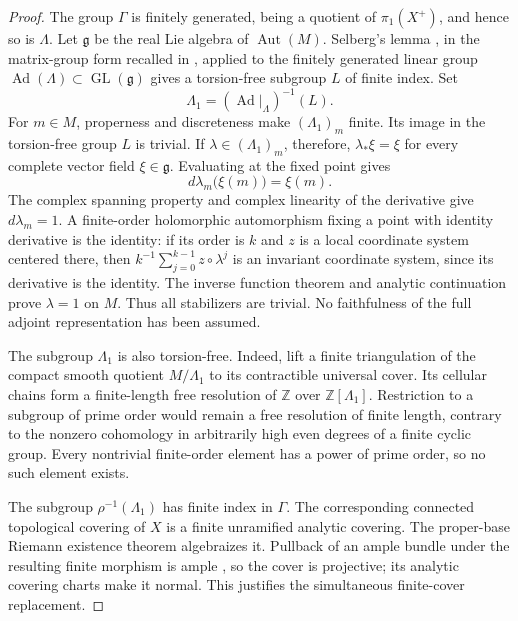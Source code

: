 \begin{proof}
The group $\Gamma$ is finitely generated, being a quotient of $\pi_1(X^+)$, and hence so is $\Lambda$. Let $\mathfrak{g}$ be the real Lie algebra of $\operatorname{Aut}(M)$. Selberg's lemma \cite[Lemma~8]{Selberg1960}, in the matrix-group form recalled in \cite[p.~435]{Wolf1968}, applied to the finitely generated linear group $\operatorname{Ad}(\Lambda)\subset\operatorname{GL}(\mathfrak{g})$ gives a torsion-free subgroup $L$ of finite index.  Set
\[
 \Lambda_1=(\operatorname{Ad}|_\Lambda)^{-1}(L).
\]
For $m\in M$, properness and discreteness make $(\Lambda_1)_m$ finite. Its image in the torsion-free group $L$ is trivial. If $\lambda\in(\Lambda_1)_m$, therefore, $\lambda_*\xi=\xi$ for every complete vector field $\xi\in\mathfrak{g}$.  Evaluating at the fixed point gives
\[
 d\lambda_m\bigl(\xi(m)\bigr)=\xi(m).
\]
The complex spanning property and complex linearity of the derivative give $d\lambda_m=1$.  A finite-order holomorphic automorphism fixing a point with identity derivative is the identity: if its order is $k$ and $z$ is a local coordinate system centered there, then $k^{-1}\sum_{j=0}^{k-1}z\circ\lambda^j$ is an invariant coordinate system, since its derivative is the identity.  The inverse function theorem and analytic continuation prove $\lambda=1$ on $M$. Thus all stabilizers are trivial.  No faithfulness of the full adjoint representation has been assumed.

The subgroup $\Lambda_1$ is also torsion-free.  Indeed, lift a finite triangulation of the compact smooth quotient $M/\Lambda_1$ to its contractible universal cover.  Its cellular chains form a finite-length free resolution of $\mathbb{Z}$ over $\mathbb{Z}[\Lambda_1]$.  Restriction to a subgroup of prime order would remain a free resolution of finite length, contrary to the nonzero cohomology in arbitrarily high even degrees of a finite cyclic group.  Every nontrivial finite-order element has a power of prime order, so no such element exists.

The subgroup $\rho^{-1}(\Lambda_1)$ has finite index in $\Gamma$. The corresponding connected topological covering of $X$ is a finite unramified analytic covering. The proper-base Riemann existence theorem \cite[XII, Corollary~4.6]{SGA1} algebraizes it. Pullback of an ample bundle under the resulting finite morphism is ample \cite[Tag~\href{https://stacks.math.columbia.edu/tag/0B5V}{0B5V}]{Stacks}, so the cover is projective; its analytic covering charts make it normal.  This justifies the simultaneous finite-cover replacement.
\end{proof}

